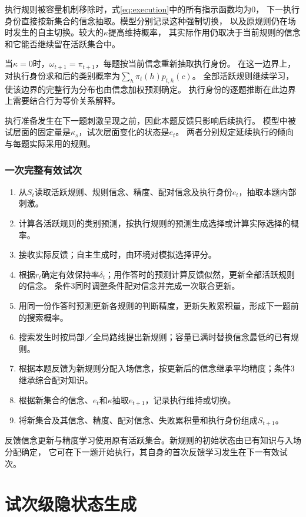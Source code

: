 \documentclass[11pt,a4paper]{article}
\numberwithin{equation}{section}
\begin{document}
执行规则被容量机制移除时，式\eqref{eq:execution}中的所有指示函数均为0，
下一执行身份直接按新集合的信念抽取。模型分别记录这种强制切换，
以及原规则仍在场时发生的自主切换。较大的$\kappa$提高维持概率，
其实际作用仍取决于当前规则的信念和它能否继续留在活跃集合中。

当$\kappa=0$时，$\omega_{t+1}=\pi_{t+1}$，每题按当前信念重新抽取执行身份。
在这一边界上，对执行身份求和后的类别概率为$\sum_h\pi_t(h)p_{t,h}(c)$。
全部活跃规则继续学习，使该边界的完整行为分布也由信念加权预测确定。
执行身份的逐题推断在此边界上需要结合行为等价关系解释。

执行准备发生在下一题刺激呈现之前，因此本题反馈只影响后续执行。
模型中被试层面的固定量是$\kappa_s$，试次层面变化的状态是$e_t$。
两者分别规定延续执行的倾向与每题实际采用的规则。

\subsubsection{一次完整有效试次}
\begin{enumerate}
\item 从$S_t$读取活跃规则、规则信念、精度、配对信念及执行身份$e_t$，抽取本题内部刺激。
\item 计算各活跃规则的类别预测，按执行规则的预测生成选择或计算实际选择的概率。
\item 接收实际反馈；自主生成时，由环境对模拟选择评分。
\item 根据$r_t$确定有效保持率$\delta_t$；用作答时的预测计算反馈似然，更新全部活跃规则的信念。
条件3同时调整条件配对信念并完成一次联合更新。
\item 用同一份作答时预测更新各规则的判断精度，更新失败累积量，形成下一题前的搜索概率。
\item 搜索发生时按局部／全局路线提出新规则；容量已满时替换信念最低的已有规则。
\item 根据本题反馈为新规则分配入场信念，按更新后的信念继承平均精度；条件3继承综合配对知识。
\item 根据新集合的信念、$e_t$和$\kappa$抽取$e_{t+1}$，记录执行维持或切换。
\item 将新集合及其信念、精度、配对信念、失败累积量和执行身份组成$S_{t+1}$。
\end{enumerate}
反馈信念更新与精度学习使用原有活跃集合。新规则的初始状态由已有知识与入场分配确定，
它可在下一题开始执行，其自身的首次反馈学习发生在下一有效试次。

\section{试次级隐状态生成}
\label{sec:kernel}
\end{document}
